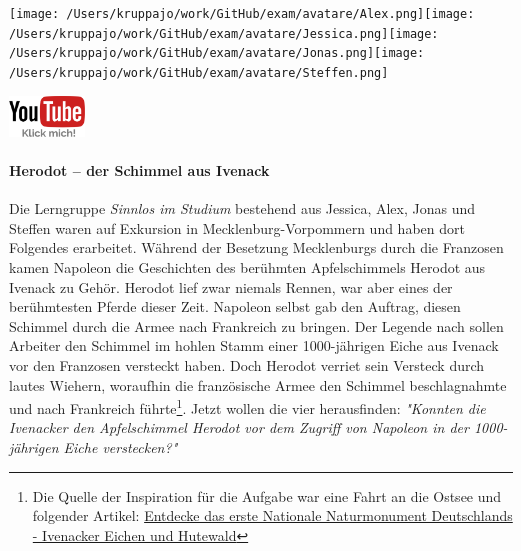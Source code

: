\documentclass[a4paper, 9pt]{scrartcl}\usepackage[]{graphicx}\usepackage[]{xcolor}
\begin{document}
 
\begin{minipage}[t]{0.5\textwidth}
\texttt{[image: /Users/kruppajo/work/GitHub/exam/avatare/Alex.png]}\hspace{-4mm}\texttt{[image: /Users/kruppajo/work/GitHub/exam/avatare/Jessica.png]}\hspace{-4mm}\texttt{[image: /Users/kruppajo/work/GitHub/exam/avatare/Jonas.png]}\hspace{-4mm}\texttt{[image: /Users/kruppajo/work/GitHub/exam/avatare/Steffen.png]}
\end{minipage}
\begin{minipage}[t]{0.5\textwidth}
\hfill
\href{https://youtu.be/Fu8kN0Uj13Y}{\includegraphics[width = 2cm]{img/youtube}}
\end{minipage}



\paragraph{Herodot – der Schimmel aus Ivenack}

Die Lerngruppe \textit{Sinnlos im Studium} bestehend aus Jessica, Alex, Jonas und Steffen waren auf Exkursion in Mecklenburg-Vorpommern und haben dort Folgendes erarbeitet. Während der Besetzung Mecklenburgs durch die Franzosen kamen Napoleon die Geschichten des berühmten Apfelschimmels Herodot aus Ivenack zu Gehör. Herodot lief zwar niemals Rennen, war aber eines der berühmtesten Pferde dieser Zeit. Napoleon selbst gab den Auftrag, diesen Schimmel durch die Armee nach Frankreich zu bringen. Der Legende nach sollen Arbeiter den Schimmel im hohlen Stamm einer 1000-jährigen Eiche aus Ivenack vor den Franzosen versteckt haben. Doch Herodot verriet sein Versteck durch lautes Wiehern, woraufhin die französische Armee den Schimmel beschlagnahmte und nach Frankreich führte\footnote{Die Quelle der Inspiration  für die Aufgabe war eine Fahrt an die Ostsee und folgender Artikel:
  \href{https://www.wald-mv.de/landingpage/ivenacker-eichen/}{Entdecke das erste Nationale Naturmonument Deutschlands - Ivenacker Eichen und Hutewald}}. Jetzt wollen die vier herausfinden: \textit{"Konnten die Ivenacker den Apfelschimmel Herodot vor dem Zugriff von Napoleon in der 1000-jährigen Eiche verstecken?"} 
\end{document}
